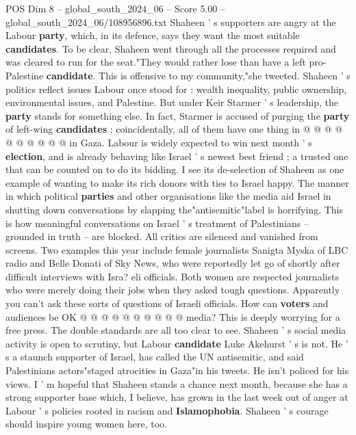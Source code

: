 \begin{textsample}{POS Dim 8 – global\_south\_2024\_06 – Score 5.00 – global\_south\_2024\_06/108956896.txt}
Shaheen ' s supporters are angry at the Labour \textbf{party}, which, in its defence, says they want the most suitable \textbf{candidates}.
To be clear, Shaheen went through all the processes required and was cleared to run for the seat."They would rather lose than have a left pro-Palestine \textbf{candidate}.
This is offensive to my community,"she tweeted.
Shaheen ' s politics reflect issues Labour once stood for : wealth inequality, public ownership, environmental issues, and Palestine.
But under Keir Starmer ' s leadership, the \textbf{party} stands for something else.
In fact, Starmer is accused of purging the \textbf{party} of left-wing \textbf{candidates} ; coincidentally, all of them have one thing in @ @ @ @ @ @ @ @ @ @ in Gaza.
Labour is widely expected to win next month ' s \textbf{election}, and is already behaving like Israel ' s newest best friend ; a trusted one that can be counted on to do its bidding.
I see its de-selection of Shaheen as one example of wanting to make its rich donors with ties to Israel happy.
The manner in which political \textbf{parties} and other organisations like the media aid Israel in shutting down conversations by slapping the"antisemitic"label is horrifying.
This is how meaningful conversations on Israel ' s treatment of Palestinians -- grounded in truth -- are blocked.
All critics are silenced and vanished from screens.
Two examples this year include female journalists Sanigta Myska of LBC radio and Belle Donati of Sky News, who were reportedly let go of shortly after difficult interviews with Isra? eli officials.
Both women are respected journalists who were merely doing their jobs when they asked tough questions.
Apparently you can't ask these sorts of questions of Israeli officials.
How can \textbf{voters} and audiences be OK @ @ @ @ @ @ @ @ @ @ media?
This is deeply worrying for a free press.
The double standards are all too clear to see.
Shaheen ' s social media activity is open to scrutiny, but Labour \textbf{candidate} Luke Akehurst ' s is not.
He ' s a staunch supporter of Israel, has called the UN antisemitic, and said Palestinians actors"staged atrocities in Gaza"in his tweets.
He isn't policed for his views.
I ' m hopeful that Shaheen stands a chance next month, because she has a strong supporter base which, I believe, has grown in the last week out of anger at Labour ' s policies rooted in racism and \textbf{Islamophobia}.
Shaheen ' s courage should inspire young women here, too.

\end{textsample}
